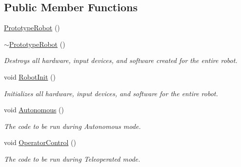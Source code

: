 \subsection*{\-Public \-Member \-Functions}
\begin{DoxyCompactItemize}
\item 
\hyperlink{class_prototype_robot_ae07d64e3122e204dce1ea3085a09db23}{\-Prototype\-Robot} ()
\item 
\hyperlink{class_prototype_robot_a3164697dc4ba8598f02196cd2d0781a2}{$\sim$\-Prototype\-Robot} ()
\begin{DoxyCompactList}\small\item\em \-Destroys all hardware, input devices, and software created for the entire robot. \end{DoxyCompactList}\item 
void \hyperlink{class_prototype_robot_a284537e39942c05f2ab2ded095235564}{\-Robot\-Init} ()
\begin{DoxyCompactList}\small\item\em \-Initializes all hardware, input devices, and software for the entire robot. \end{DoxyCompactList}\item 
void \hyperlink{class_prototype_robot_aa9435e95526e228db834f6cbec379d5d}{\-Autonomous} ()
\begin{DoxyCompactList}\small\item\em \-The code to be run during \-Autonomous mode. \end{DoxyCompactList}\item 
void \hyperlink{class_prototype_robot_a0f748c5f16855cd872120c20d807c968}{\-Operator\-Control} ()
\begin{DoxyCompactList}\small\item\em \-The code to be run during \-Teleoperated mode. \end{DoxyCompactList}\end{DoxyCompactItemize}
